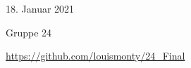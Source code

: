 \begin{titlepage}
\begin{center}
\begin{center}
\end{center}

18. Januar 2021

\vspace{0.1cm}

Gruppe 24

\vspace{0.3cm}

\url{https://github.com/louismonty/24_Final}
\end{center}
\end{titlepage}